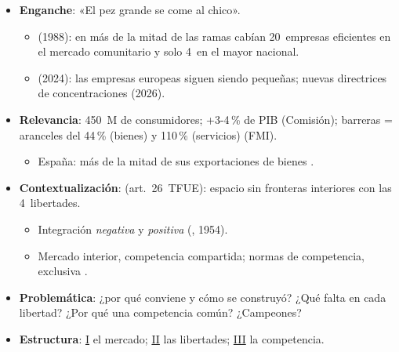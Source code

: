 \documentclass{article}
\begin{document}
\cabecerarepaso
\begin{columnas}

\begin{itemize}
\item \textbf{Enganche}: «El pez grande se come al chico».
  \begin{itemize}
  \item {} (1988): en más de la mitad de las ramas cabían 20~empresas eficientes en el mercado comunitario y solo 4~en el mayor nacional.
  \item {} (2024): las empresas europeas siguen siendo pequeñas; nuevas directrices de concentraciones (2026).
  \end{itemize}
\item \textbf{Relevancia}: 450~M de consumidores; +3-4\,\% de PIB (Comisión); barreras = aranceles del 44\,\% (bienes) y 110\,\% (servicios) (FMI).
  \begin{itemize}
  \item España: más de la mitad de sus exportaciones de bienes .
  \end{itemize}
\item \textbf{Contextualización}:  (art.~26~TFUE): espacio sin fronteras interiores con las 4~libertades.
  \begin{itemize}
  \item Integración \emph{negativa} y \emph{positiva} (, 1954).
  \item Mercado interior, competencia compartida; normas de competencia, exclusiva .
  \end{itemize}
\item \textbf{Problemática}: ¿por qué conviene y cómo se construyó? ¿Qué falta en cada libertad? ¿Por qué una competencia común? ¿Campeones?
\item \textbf{Estructura}: \hyperref[rep:I]{I} el mercado; \hyperref[rep:II]{II} las libertades; \hyperref[rep:III]{III} la competencia.
\end{itemize}


\end{columnas}
\end{document}
